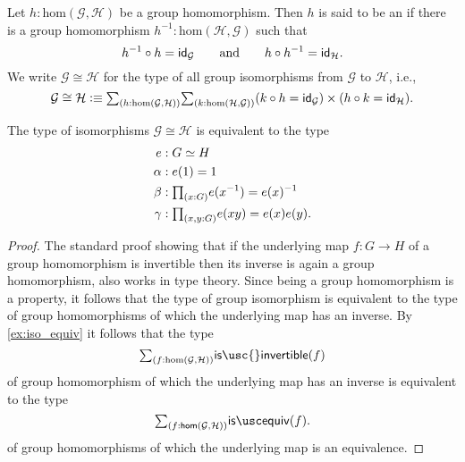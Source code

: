 \begin{defn}
Let $h:\mathrm{hom}(\mathcal{G},\mathcal{H})$ be a group homomorphism. Then $h$ is said to be an  if there is a group homomorphism $h^{-1}:\mathrm{hom}(\mathcal{H},\mathcal{G})$ such that
\begin{equation*}
h^{-1}\circ h=\idfunc[\mathcal{G}]\qquad\text{and}\qquad h\circ h^{-1}=\idfunc[\mathcal{H}].
\end{equation*}
We write $\mathcal{G}\cong\mathcal{H}$ for the type of all group isomorphisms from $\mathcal{G}$ to $\mathcal{H}$, i.e.,
\begin{equation*}
\mathcal{G}\cong\mathcal{H} \defeq \sm{h:\mathrm{hom}(\mathcal{G},\mathcal{H})}{k:\mathrm{hom}(\mathcal{H},\mathcal{G})} (k\circ h = \idfunc[\mathcal{G}])\times (h\circ k=\idfunc[\mathcal{H}]).
\end{equation*}
\end{defn}

\begin{lem}\label{lem:grp_iso}
The type of isomorphisms $\mathcal{G}\cong\mathcal{H}$ is equivalent to the type
\begin{align*}
e & : \eqv{G}{H} \\
\alpha & : e(1)=1 \\
\beta & : \prd{x:G}e(x^{-1})=e(x)^{-1} \\
\gamma & : \prd{x,y:G} e(xy)=e(x)e(y).
\end{align*}
\end{lem}

\begin{proof}
The standard proof showing that if the underlying map $f:G\to H$ of a group homomorphism is invertible then its inverse is again a group homomorphism, also works in type theory. Since being a group homomorphism is a property, it follows that the type of group isomorphism is equivalent to the type of group homomorphisms of which the underlying map has an inverse. By \cref{ex:iso_equiv} it follows that the type 
\begin{equation*}
\sm{f:\mathrm{hom}(\mathcal{G},\mathcal{H})}\mathsf{is\usc{}invertible}(f)
\end{equation*}
of group homomorphism of which the underlying map has an inverse is equivalent to the type
\begin{equation*}
\sm{f:\mathsf{hom}(\mathcal{G},\mathcal{H})}\isequiv(f).
\end{equation*}
of group homomorphisms of which the underlying map is an equivalence.
\end{proof}

